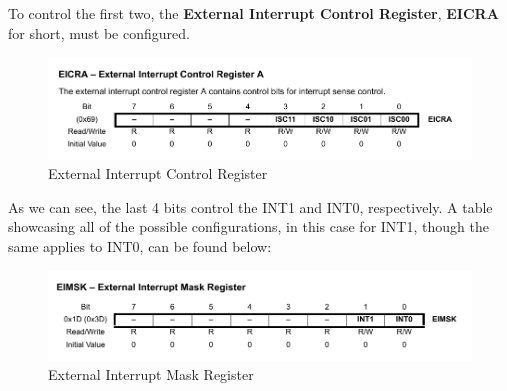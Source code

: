 To control the first two, the \textbf{External Interrupt Control Register}, \textbf{EICRA} for short, must be configured.

\begin{figure}[H]
    \centering
    \includegraphics[width = \textwidth]{Graphics/MICROS/Practice 3/DATASHEET/EICRA.pdf}
    \caption{External Interrupt Control Register~\autocite{ATMEGA328P}}
    \label{fig:EICRA}
\end{figure}

As we can see, the last 4 bits control the INT1 and INT0, respectively. A table showcasing all of the possible configurations, in this case for INT1, though the same applies to INT0, can be found below:


\begin{table}[H]
\end{table}



\begin{figure}[H]
    \centering
    \includegraphics[width = \textwidth]{Graphics/MICROS/Practice 3/DATASHEET/EIMSK.pdf}
    \caption{External Interrupt Mask Register~\autocite{ATMEGA328P}}
    \label{fig:EIMSK}
\end{figure}

